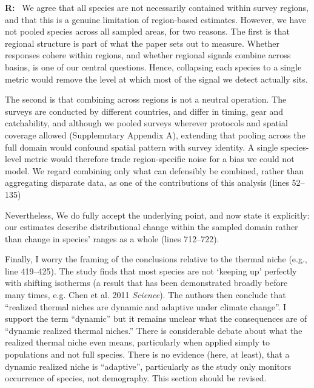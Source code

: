 \documentclass[11pt]{article}
\newcommand{\reviewer}[1]{\par\medskip\noindent\textcolor{revcolor}{#1}\par}
\newenvironment{reply}
{\par\smallskip\begingroup\color{replycolor}\noindent\textbf{R:}\ }
{\endgroup\par\medskip}
\begin{document}
\begin{reply}
We agree that all species are not necessarily contained within survey regions, and that this is a genuine limitation of region-based estimates. However, we have not pooled species across all sampled areas, for two reasons. The first is that regional structure is part of what the paper sets out to measure. Whether responses cohere within regions, and whether regional signals combine across basins, is one of our central questions. Hence, collapsing each species to a single metric would remove the level at which most of the signal we detect actually sits.

The second is that combining across regions is not a neutral operation. The surveys are conducted by different countries, and differ in timing, gear and catchability, and although we pooled surveys wherever protocols and spatial coverage allowed (Supplemntary Appendix A), extending that pooling across the full domain would confound spatial pattern with survey identity. A single species-level metric would therefore trade region-specific noise for a bias we could not model. We regard combining only what can defensibly be combined, rather than aggregating disparate data, as one of the contributions of this analysis (lines 52--135)

Nevertheless, We do fully accept the underlying point, and now state it explicitly: our estimates describe distributional change within the sampled domain rather than change in species' ranges as a whole (lines 712--722).
\end{reply}

\reviewer{Finally, I worry the framing of the conclusions relative to the thermal niche (e.g., line 419--425). The study finds that most species are not `keeping up' perfectly with shifting isotherms (a result that has been demonstrated broadly before many times, e.g. Chen et al. 2011 \textit{Science}). The authors then conclude that ``realized thermal niches are dynamic and adaptive under climate
change''. I support the term ``dynamic'' but it remains unclear what the
consequences are of ``dynamic realized thermal niches.'' There is considerable debate about what the realized thermal niche even means, particularly when applied simply to populations and not full species. There is no evidence (here, at least), that a dynamic realized niche is ``adaptive'', particularly as the study only monitors occurrence of species, not demography. This section should be revised.}
\end{document}
